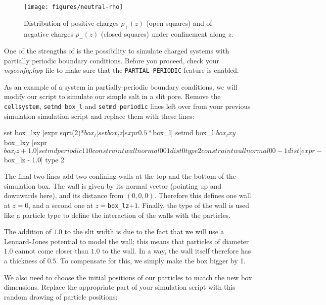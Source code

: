 \documentclass[
a4paper,                        %
11pt,                           %
twoside,                        %
footsepline,                    %
headsepline,                    %
headexclude,                    %
footexclude,                    %
pagesize,                       %
]{scrartcl}
\begin{document}
\iffalse
\begin{figure}[h]
  \centering
  \texttt{[image: figures/neutral-rho]}
  \caption{Distribution of positive charges $\rho_+(z)$ (open squares)
    and of negative charges $\rho_-(z)$ (closed squares) under
    confinement along $z$.}
  \label{fig:neutralrho}
\end{figure}

One of the strengths of \es{} is the possibility to simulate charged
systems with partially periodic boundary conditions.
Before you proceed, check your \emph{myconfig.hpp} file to make
sure that the \verb|PARTIAL_PERIODIC| feature is enabled.

As an example of a system in partially-periodic boundary conditions,
we will modify our script to simulate our simple salt in a slit pore.
Remove the \verb|cellsystem|, \verb|setmd box_l| and \verb|setmd periodic| lines left
over from your previous simulation simulation script and replace them
with these lines:

\begin{tclcode}
  set box_lxy [expr sqrt(2)*$box_l]
  set box_lz  [expr 0.5*$box_l]
  setmd box_l $box_lxy $box_lxy [expr $box_lz + 1.0]
  setmd periodic 1 1 0
  constraint wall normal 0 0  1 dist 0 type 2
  constraint wall normal 0 0 -1 dist [expr -$box_lz - 1.0] type 2
\end{tclcode}

The final two lines add two confining walls at the top
and the bottom of the simulation box. The wall is given by its normal
vector (pointing up and downwards here), and its distance from
$(0,0,0)$. Therefore this defines one wall at $z=0$, and a second
one at $z=$\verb|box_lz|$+1$. Finally, the type of the wall is used like a
particle type to define the interaction of the walls with the particles.

The addition of $1.0$ to the slit width is due to the fact that we will
use a Lennard-Jones potential to model the wall; this means that
particles of diameter $1.0$ cannot come closer than $1.0$ to the wall. In a
way, the wall itself therefore has a thickness of $0.5$. To compensate
for this, we simply make the box bigger by 1.

We also need to choose the initial positions of our particles to match
the new box dimensions. Replace the appropriate part of your
simulation script with this random drawing of particle positions:

\end{document}
